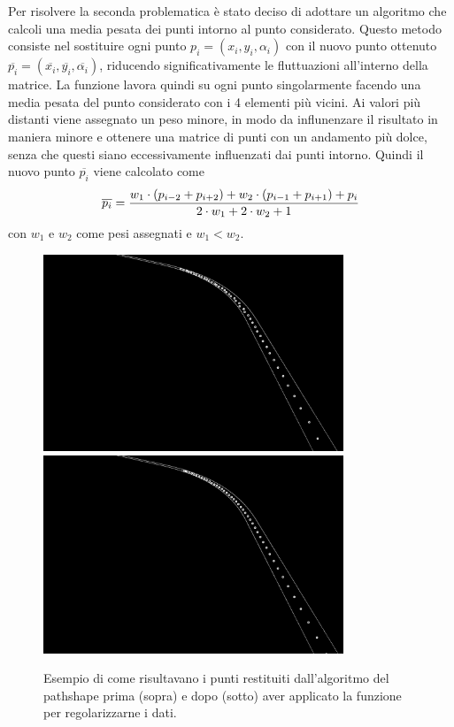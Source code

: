 Per risolvere la seconda problematica è stato deciso di adottare un algoritmo che calcoli una media pesata dei punti intorno al punto considerato. Questo metodo consiste nel sostituire ogni punto $p_i = (x_i, y_i, \alpha_i)$ con il nuovo punto ottenuto $\overline{p_i} = (\overline{x_i}, \overline{y_i}, \overline{\alpha_i})$, riducendo significativamente le fluttuazioni all'interno della matrice. La funzione lavora quindi su ogni punto singolarmente facendo una media pesata del punto considerato con i 4 elementi più vicini. Ai valori più distanti viene assegnato un peso minore, in modo da influnenzare il risultato in maniera minore e ottenere una matrice di punti con un andamento più dolce, senza che questi siano eccessivamente influenzati dai punti intorno.
Quindi il nuovo punto $\overline{p_i}$ viene calcolato come $$\overline{p_i} = {w_1\cdot (p_{i-2}+p_{i+2})+w_2\cdot (p_{i-1}+p_{i+1})+p_i \over 2\cdot w_1+2\cdot w_2+1}$$
con $w_1$ e $w_2$ come pesi assegnati e $w_1 < w_2$.
\begin{figure}[!ht]
    \centering
    \includegraphics[width=0.8\textwidth]{img/pathshapeoriginal}
    \includegraphics[width=0.8\textwidth]{img/pathshapefilter}
    \caption[Punti restituiti dall'algoritmo pathshape prima del filtro.]{Esempio di come risultavano i punti restituiti dall'algoritmo del pathshape prima (sopra) e dopo (sotto) aver applicato la funzione per regolarizzarne i dati.}
\end{figure}

